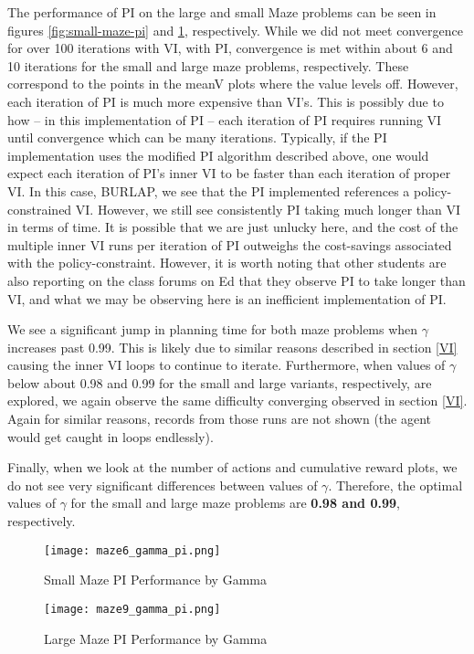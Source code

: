 \documentclass{article}
\begin{document}
The performance of PI on the large and small Maze problems can be seen in figures \ref{fig:small-maze-pi} and \ref{fig:large-maze-pi},
respectively. While we did not meet convergence for over 100 iterations with VI, with PI, convergence is met within about 6 and 10 iterations
for the small and large maze problems, respectively. These correspond to the points in the meanV plots where the value levels off. However,
each iteration of PI is much more expensive than VI's. This is possibly due to how -- in this implementation of PI -- each iteration of
PI requires running VI until convergence which can be many iterations. Typically, if the PI implementation uses the modified PI algorithm
described above, one would expect each iteration of PI's inner VI to be faster than each iteration of proper VI. In this case, BURLAP, we
see that the PI implemented references a policy-constrained VI. However, we still see consistently PI taking much longer than VI in terms of
time. It is possible that we are just unlucky here, and the cost of the multiple inner VI runs per iteration of PI outweighs the cost-savings
associated with the policy-constraint. However, it is worth noting that other students are also reporting on the class forums on Ed that they
observe PI to take longer than VI, and what we may be observing here is an inefficient implementation of PI.

We see a significant jump in planning time for both maze problems when $\gamma$ increases past 0.99. This is likely due to similar reasons
described in section \ref{VI} causing the inner VI loops to continue to iterate. Furthermore, when values of $\gamma$ below about 0.98 and 0.99
for the small and large variants, respectively, are explored, we again observe the same difficulty converging observed in section \ref{VI}.
Again for similar reasons, records from those runs are not shown (the agent would get caught in loops endlessly).

Finally, when we look at the number of actions and cumulative reward plots, we do not see very significant differences between values of
$\gamma$. Therefore, the optimal values of $\gamma$ for the small and large maze problems are \textbf{0.98 and 0.99}, respectively.

\begin{figure}
    \centering
    \begin{minipage}{0.5\textwidth}
        \centering
        \texttt{[image: maze6\_gamma\_pi.png]}
        \caption{Small Maze PI Performance by Gamma}
        \label{fig:small-maze-pi}
    \end{minipage}\hfill
    \begin{minipage}{0.5\textwidth}
        \centering
        \texttt{[image: maze9\_gamma\_pi.png]}
        \caption{Large Maze PI Performance by Gamma}
        \label{fig:large-maze-pi}
    \end{minipage}
\end{figure}
\end{document}
